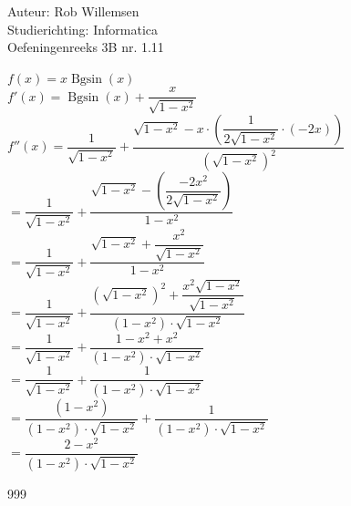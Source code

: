 \documentclass[a4paper]{article}
\begin{document}
\noindent \large Auteur: Rob Willemsen \\
\noindent \large Studierichting: Informatica \\
\noindent \large Oefeningenreeks 3B nr. 1.11 \\

\medskip

\normalsize

$f(x) = x\operatorname{Bgsin}(x)$ \\

$f'(x) = \operatorname{Bgsin}(x) + \dfrac{x}{\sqrt{1-x^2}}$ \\

$f''(x) = \dfrac{1}{\sqrt{1-x^2}} + \dfrac{\sqrt{1-x^2} - x \cdot \left(\dfrac{1}{2\sqrt{1-x^2}} \cdot (-2x)\right)}{\left(\sqrt{1-x^2}\right)^2}$ \\

$= \dfrac{1}{\sqrt{1-x^2}} + \dfrac{\sqrt{1-x^2} - \left(\dfrac{-2x^2}{2\sqrt{1-x^2}}\right)}{1-x^2}$ \\

$= \dfrac{1}{\sqrt{1-x^2}} + \dfrac{\sqrt{1-x^2} + \dfrac{x^2}{\sqrt{1-x^2}}}{1-x^2}$ \\

$= \dfrac{1}{\sqrt{1-x^2}} + \dfrac{\left(\sqrt{1-x^2}\right)^2 + \dfrac{x^2\sqrt{1-x^2}}{\sqrt{1-x^2}}}{(1-x^2) \cdot \sqrt{1-x^2}}$ \\

$= \dfrac{1}{\sqrt{1-x^2}} + \dfrac{1-x^2 + x^2}{(1-x^2) \cdot \sqrt{1-x^2}}$ \\

$= \dfrac{1}{\sqrt{1-x^2}} + \dfrac{1}{(1-x^2) \cdot \sqrt{1-x^2}}$ \\

$= \dfrac{(1-x^2)}{(1-x^2) \cdot \sqrt{1-x^2}} + \dfrac{1}{(1-x^2) \cdot \sqrt{1-x^2}}$ \\

$= \dfrac{2-x^2}{(1-x^2) \cdot \sqrt{1-x^2}}$ \\

\begin{thebibliography}{999}
\end{thebibliography}
\end{document}
